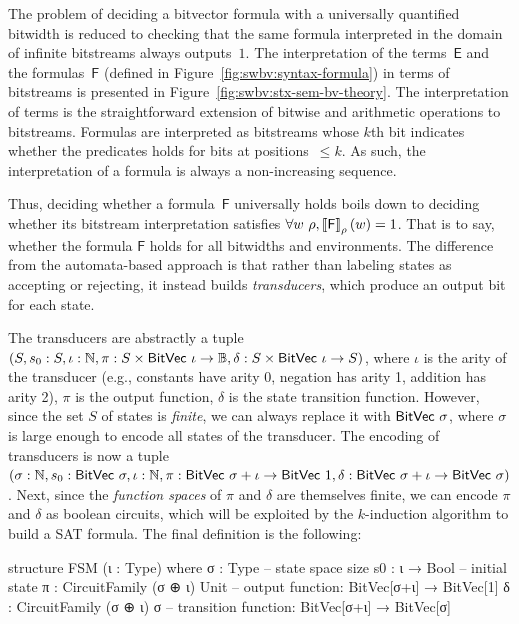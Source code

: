 The problem of deciding a bitvector formula with a universally quantified
bitwidth is reduced to checking that the same formula interpreted in the domain
of infinite bitstreams always outputs~$1$.
%
The interpretation of the terms~$\mathsf E$ and
the formulas~$\mathsf F$ (defined in Figure~\ref{fig:swbv:syntax-formula}) in terms
of bitstreams is presented in Figure~\ref{fig:swbv:stx-sem-bv-theory}.
%
The interpretation of terms is the straightforward extension of bitwise and
arithmetic operations to bitstreams. Formulas are interpreted as bitstreams
whose $k$th bit indicates whether the predicates holds for bits at
positions~$\leq k$.
%
As such, the interpretation of a formula is always a non-increasing sequence.

Thus, deciding whether a formula~$\mathsf F$ universally holds boils down to
deciding whether its bitstream interpretation satisfies $\forall w~\rho,
\left\llbracket \mathsf F \right\rrbracket_\rho(w) = 1$.
%
That is to say, whether the formula $\mathsf F$ holds for all bitwidths and
environments. The difference from the automata-based approach is that rather
than labeling states as accepting or rejecting, it instead builds
\emph{transducers}, which produce an output bit for each state.

The transducers are abstractly a tuple $(S, s_0 : S, \iota : \mathbb N, \pi : S \times
\mathsf{BitVec}~{\iota} \to \mathbb B, \delta : S \times \mathsf{BitVec}~{\iota} \to S)$, where $\iota$ is the
arity of the transducer (e.g., constants have arity 0, negation has arity 1,
addition has arity 2), $\pi$ is the output function, $\delta$ is the state
transition function. However, since the set $S$ of states is \emph{finite}, we
can always replace it with $\mathsf{BitVec}~{\sigma}$, where $\sigma$ is large enough to
encode all states of the transducer.
%
The encoding of transducers is now a tuple $(\sigma : \mathbb N, s_0 :
\mathsf{BitVec}~{\sigma}, \iota : \mathbb N, \pi : \mathsf{BitVec}~{\sigma+\iota} \to \mathsf{BitVec}~{1}, \delta :
\mathsf{BitVec}~{\sigma+\iota} \to \mathsf{BitVec}~{\sigma})$.
%
Next, since the \emph{function spaces} of $\pi$ and $\delta$ are themselves
finite, we can encode $\pi$ and $\delta$ as boolean circuits, which will be
exploited by the $k$-induction algorithm to build a SAT formula.
%
The final definition is the following:
%
\begin{lean}
structure FSM (ι  : Type) where
  σ  : Type  -- state space size
  s0 : ι → Bool -- initial state
  π  : CircuitFamily (σ ⊕ ι) Unit -- output function: BitVec[σ+ι] → BitVec[1]
  δ  : CircuitFamily (σ ⊕ ι) σ -- transition function: BitVec[σ+ι] → BitVec[σ]
\end{lean}


